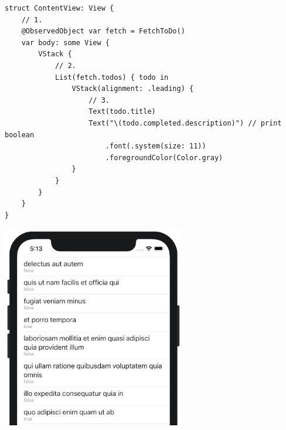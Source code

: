 \documentclass[a4paper,12pt]{article}
\begin{document}
\begin{enumerate}
\begin{lstlisting}
struct ContentView: View {
    // 1.
    @ObservedObject var fetch = FetchToDo()
    var body: some View {
        VStack {
            // 2.
            List(fetch.todos) { todo in
                VStack(alignment: .leading) {
                    // 3.
                    Text(todo.title)
                    Text("\(todo.completed.description)") // print boolean
                        .font(.system(size: 11))
                        .foregroundColor(Color.gray)
                }
            }
        }
    }
}
\end{lstlisting}
\begin{center}
\includegraphics[width=300]{images/json-1.jpg}
\label{fig:JSON-1}
\end{center}
\end{enumerate}
\end{document}
